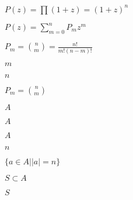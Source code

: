 \documentclass[10pt]{book}
\begin{document}
\begin{mdSnippets}
\begin{mdInlineSnippet}[f5f7fbbfa195fd2927233b3c7907e8ab]%
$P(z)=\prod(1+z)=(1+z)^n$\end{mdInlineSnippet}%
\begin{mdInlineSnippet}[8603ab863c9672a003e2c7d8bfd4978d]%
$P(z)=\sum_{m=0}^nP_m z^m$\end{mdInlineSnippet}%
\begin{mdInlineSnippet}[ee4749c6216413f4bf62fc9a716aa8ae]%
$P_m = {n \choose m}=\frac{n!}{m!(n-m)!}$\end{mdInlineSnippet}%
\begin{mdInlineSnippet}[6f8f57715090da2632453988d9a1501b]%
$m$\end{mdInlineSnippet}%
\begin{mdInlineSnippet}[7b8b965ad4bca0e41ab51de7b31363a1]%
$n$\end{mdInlineSnippet}%
\begin{mdInlineSnippet}[a14e2c74172b1909afd0a1db63888220]%
$P_m={n\choose m}$\end{mdInlineSnippet}%
\begin{mdInlineSnippet}[7fc56270e7a70fa81a5935b72eacbe29]%
$A$\end{mdInlineSnippet}%
\begin{mdInlineSnippet}[7fc56270e7a70fa81a5935b72eacbe29]%
$A$\end{mdInlineSnippet}%
\begin{mdInlineSnippet}[7fc56270e7a70fa81a5935b72eacbe29]%
$A$\end{mdInlineSnippet}%
\begin{mdInlineSnippet}[7b8b965ad4bca0e41ab51de7b31363a1]%
$n$\end{mdInlineSnippet}%
\begin{mdInlineSnippet}[b403e1b8614a145573a3db818720a39d]%
$\{a\in A | |a|=n\}$\end{mdInlineSnippet}%
\begin{mdInlineSnippet}[164ad8bb8e2c661d087405b5859a2b7f]%
$S \subset A$\end{mdInlineSnippet}%
\begin{mdInlineSnippet}%
$S$\end{mdInlineSnippet}%

\end{mdSnippets}
\end{document}
